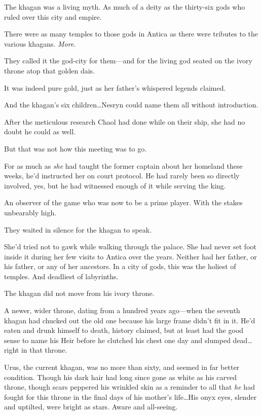 The khagan was a living myth.
As much of a deity as the thirty-six gods who ruled over this city and empire.

There were as many temples to those gods in Antica as there were tributes to the various khagans.
\emph{More}.

They called it the god-city for them---and for the living god seated on the ivory throne atop that golden dais.

It was indeed pure gold, just as her father's whispered legends claimed.

And the khagan's six children\ldots Nesryn could name them all without introduction.

After the meticulous research Chaol had done while on their ship, she had no doubt he could as well.

But that was not how this meeting was to go.

For as much as \emph{she} had taught the former captain about her homeland these weeks, he'd instructed her on court protocol.
He had rarely been so directly involved, yes, but he had witnessed enough of it while serving the king.

An observer of the game who was now to be a prime player.
With the stakes unbearably high.

They waited in silence for the khagan to speak.

She'd tried not to gawk while walking through the palace.
She had never set foot inside it during her few visits to Antica over the years.
Neither had her father, or his father, or any of her ancestors.
In a city of gods, this was the holiest of temples.
And deadliest of labyrinths.

The khagan did not move from his ivory throne.

A newer, wider throne, dating from a hundred years ago---when the seventh khagan had chucked out the old one because his large frame didn't fit in it.
He'd eaten and drunk himself to death, history claimed, but at least had the good sense to name his Heir before he clutched his chest one day and slumped dead\ldots right in that throne.

Urus, the current khagan, was no more than sixty, and seemed in far better condition.
Though his dark hair had long since gone as white as his carved throne, though scars peppered his wrinkled skin as a reminder to all that \emph{he} had fought for this throne in the final days of his mother's life\ldots His onyx eyes, slender and uptilted, were bright as stars.
Aware and all-seeing.

